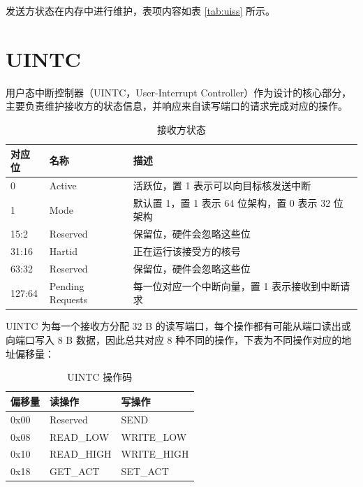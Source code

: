 发送方状态在内存中进行维护，表项内容如表 \ref{tab:uiss} 所示。

\section{UINTC}

用户态中断控制器（UINTC，User-Interrupt Controller）作为设计的核心部分，主要负责维护接收方的状态信息，并响应来自读写端口的请求完成对应的操作。

\begin{table}
    \centering
    \begin{threeparttable}[c]
        \label{tab:uirs}
        \begin{tabular}{|l|l|l|}
            \hline
            对应位 & 名称 & 描述 \\
            \hline
            0 & Active & 活跃位，置 1 表示可以向目标核发送中断 \\
            \hline
            1 & Mode & 默认置 1，置 1 表示 64 位架构，置 0 表示 32 位架构 \\
            \hline
            15:2 & Reserved & 保留位，硬件会忽略这些位 \\
            \hline
            31:16 & Hartid & 正在运行该接受方的核号 \\
            \hline
            63:32 & Reserved & 保留位，硬件会忽略这些位 \\
            \hline
            127:64 & Pending Requests & 每一位对应一个中断向量，置 1 表示接收到中断请求 \\
            \hline
        \end{tabular}
        \caption{接收方状态}
    \end{threeparttable}
\end{table}

UINTC 为每一个接收方分配 32 B 的读写端口，每个操作都有可能从端口读出或向端口写入 8 B 数据，因此总共对应 8 种不同的操作，下表为不同操作对应的地址偏移量：

\begin{table}
    \centering
    \begin{threeparttable}[c]
        \label{tab:uintc}
        \begin{tabular}{|l|l|l|}
            \hline
            偏移量 & 读操作 & 写操作 \\
            \hline
            0x00 & Reserved & SEND \\
            \hline
            0x08 & READ\_LOW & WRITE\_LOW \\
            \hline
            0x10 & READ\_HIGH & WRITE\_HIGH \\
            \hline
            0x18 & GET\_ACT & SET\_ACT \\
            \hline
        \end{tabular}
        \caption{UINTC 操作码}
    \end{threeparttable}
\end{table}

